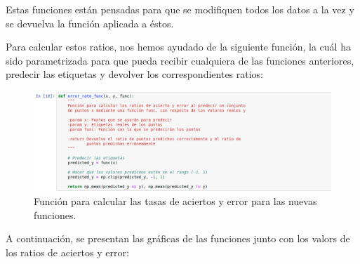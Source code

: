 \documentclass[11pt,a4paper]{article}
\begin{document}
Estas funciones están pensadas para que se modifiquen todos los datos a la vez y se devuelva la
función aplicada a éstos.

Para calcular estos ratios, nos hemos ayudado de la siguiente función, la cuál ha sido parametrizada
para que pueda recibir cualquiera de las funciones anteriores, predecir las etiquetas y devolver
los correspondientes ratios:

\begin{figure}[H]
\centering
\includegraphics[scale=0.4]{img/error_rate_func.png}
\caption{Función para calcular las tasas de aciertos y error para las nuevas funciones.}
\end{figure}

A continuación, se presentan las gráficas de las funciones junto con los valors de los ratios
de aciertos y error:
\end{document}
